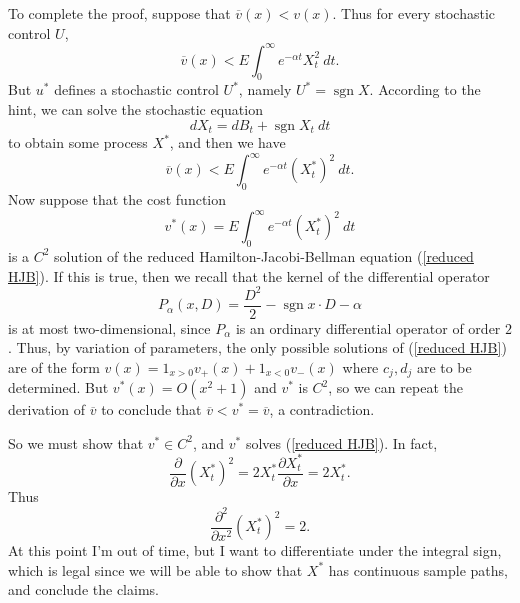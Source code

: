 \documentclass[10pt]{article}
\newcommand{\sgn}{\operatorname{sgn}}
\theoremstyle{definition}
\begin{document}
To complete the proof, suppose that $\overline v(x) < v(x)$.
Thus for every stochastic control $U$,
$$\overline v(x) < E\int_0^\infty e^{-\alpha t} X_t^2 ~dt.$$
But $u^*$ defines a stochastic control $U^*$, namely $U^* = \sgn X$.
According to the hint, we can solve the stochastic equation
$$dX_t = dB_t + \sgn X_t ~dt$$
to obtain some process $X^*$, and then we have
$$\overline v(x) < E\int_0^\infty e^{-\alpha t} (X_t^*)^2 ~dt.$$
Now suppose that the cost function
$$v^*(x) = E\int_0^\infty e^{-\alpha t} (X_t^*)^2 ~dt$$
is a $C^2$ solution of the reduced Hamilton-Jacobi-Bellman equation (\ref{reduced HJB}).
If this is true, then we recall that the kernel of the differential operator
$$P_\alpha(x, D) = \frac{D^2}{2} - \sgn x \cdot D - \alpha$$
is at most two-dimensional, since $P_\alpha$ is an ordinary differential operator of order $2$.
Thus, by variation of parameters, the only possible solutions of (\ref{reduced HJB}) are of the form $v(x) = 1_{x > 0} v_+(x) + 1_{x < 0} v_-(x)$ where $c_j,d_j$ are to be determined.
But $v^*(x) = O(x^2 + 1)$ and $v^*$ is $C^2$, so we can repeat the derivation of $\overline v$ to conclude that $\overline v < v^* = \overline v$, a contradiction.

So we must show that $v^* \in C^2$, and $v^*$ solves (\ref{reduced HJB}).
In fact,
$$\frac{\partial}{\partial x} (X_t^*)^2 = 2X_t^* \frac{\partial X_t^*}{\partial x} = 2X_t^*.$$
Thus
$$\frac{\partial^2}{\partial x^2} (X_t^*)^2 = 2.$$
At this point I'm out of time, but I want to differentiate under the integral sign, which is legal since we will be able to show that $X^*$ has continuous sample paths, and conclude the claims.
\end{document}
